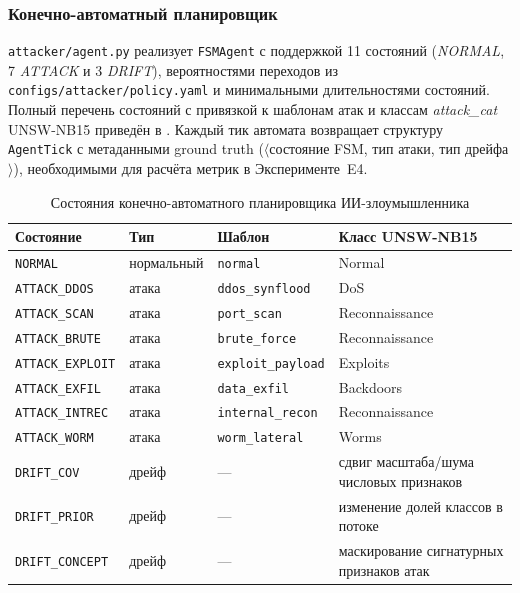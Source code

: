 \subsubsection{Конечно-автоматный планировщик}

\texttt{attacker/agent.py} реализует \texttt{FSMAgent} с поддержкой
11 состояний (\emph{NORMAL}, 7 \emph{ATTACK} и 3 \emph{DRIFT}),
вероятностями переходов из \texttt{configs/attacker/policy.yaml} и
минимальными длительностями состояний. Полный перечень состояний
с привязкой к шаблонам атак и классам \emph{attack\_cat} UNSW-NB15
приведён в . Каждый тик автомата возвращает
структуру \texttt{AgentTick} с метаданными ground truth
(\(\langle\)состояние FSM, тип атаки, тип дрейфа\(\rangle\)),
необходимыми для расчёта метрик в Эксперименте~E4.

\begin{table}[H]
\centering
\caption{Состояния конечно-автоматного планировщика
ИИ-злоумышленника}
\label{tab:fsm-states}
\renewcommand{\arraystretch}{1.2}
\setlength{\tabcolsep}{4pt}
\small
\begin{tabularx}{\linewidth}{@{}lllX@{}}
\toprule
\textbf{Состояние} & \textbf{Тип} & \textbf{Шаблон} &
\textbf{Класс UNSW-NB15} \\
\midrule
\texttt{NORMAL}         & нормальный  & \texttt{normal}         & Normal \\
\addlinespace
\texttt{ATTACK\_DDOS}   & атака       & \texttt{ddos\_synflood} & DoS \\
\texttt{ATTACK\_SCAN}   & атака       & \texttt{port\_scan}     & Reconnaissance \\
\texttt{ATTACK\_BRUTE}  & атака       & \texttt{brute\_force}   & Reconnaissance \\
\texttt{ATTACK\_EXPLOIT}& атака       & \texttt{exploit\_payload} & Exploits \\
\texttt{ATTACK\_EXFIL}  & атака       & \texttt{data\_exfil}    & Backdoors \\
\texttt{ATTACK\_INTREC} & атака       & \texttt{internal\_recon}& Reconnaissance \\
\texttt{ATTACK\_WORM}   & атака       & \texttt{worm\_lateral}  & Worms \\
\addlinespace
\texttt{DRIFT\_COV}     & дрейф       & ---                     & сдвиг масштаба/шума числовых признаков \\
\texttt{DRIFT\_PRIOR}   & дрейф       & ---                     & изменение долей классов в потоке \\
\texttt{DRIFT\_CONCEPT} & дрейф       & ---                     & маскирование сигнатурных признаков атак \\
\bottomrule
\end{tabularx}
\end{table}

